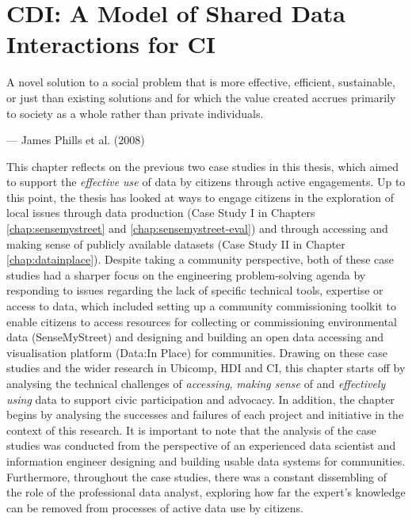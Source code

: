 \chapter[Community-Data Interaction]{CDI: A Model of Shared Data Interactions for CI}
\label{chap:cdi}
\ifpdf
    \graphicspath{{Chapter5/Figs/Raster/}{Chapter5/Figs/PDF/}{Chapter5/Figs/}}
\else
    \graphicspath{{Chapter5/Figs/Vector/}{Chapter5/Figs/}}
\fi

\epigraph{A novel solution to a social problem that is more effective, efficient, sustainable, or just than existing solutions and for which the value created accrues primarily to society as a whole rather than private individuals.}{--- \textup{James Phills et al. (2008)}}

This chapter reflects on the previous two case studies in this thesis, which aimed to support the \textit{effective use} of data by citizens through active engagements. Up to this point, the thesis has looked at ways to engage citizens in the exploration of local issues through data production (Case Study I in Chapters \ref{chap:sensemystreet} and \ref{chap:sensemystreet-eval}) and through accessing and making sense of publicly available datasets (Case Study II in Chapter \ref{chap:datainplace}). Despite taking a community perspective, both of these case studies had a sharper focus on the engineering problem-solving agenda by responding to issues regarding the lack of specific technical tools, expertise or access to data, which included setting up a community commissioning toolkit to enable citizens to access resources for collecting or commissioning environmental data (SenseMyStreet) and designing and building an open data accessing and visualisation platform (Data:In Place) for communities. Drawing on these case studies and the wider research in Ubicomp, HDI and CI, this chapter starts off by analysing the technical challenges of \textit{accessing}, \textit{making sense} of and \textit{effectively using} data to support civic participation and advocacy. In addition, the chapter begins by analysing the successes and failures of each project and initiative in the context of this research. It is important to note that the analysis of the case studies was conducted from the perspective of an experienced data scientist and information engineer designing and building usable data systems for communities. Furthermore, throughout the case studies, there was a constant dissembling of the role of the professional data analyst, exploring how far the expert's knowledge can be removed from processes of active data use by citizens. 

